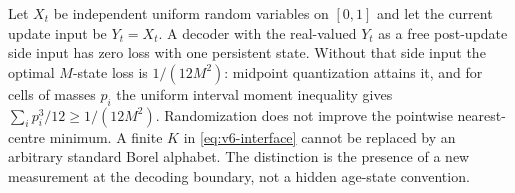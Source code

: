 \begin{example}
\label{ex:v6-interface}
Let $X_t$ be independent uniform random variables on $[0,1]$ and let
the current update input be $Y_t=X_t$. A decoder with the real-valued
$Y_t$ as a free post-update side input has zero loss with one persistent
state. Without that side input the optimal $M$-state loss is
$1/(12M^2)$: midpoint quantization attains it, and for cells of masses
$p_i$ the uniform interval moment inequality gives
$\sum_i p_i^3/12\ge1/(12M^2)$. Randomization does not improve the
pointwise nearest-centre minimum. A finite $K$ in
\eqref{eq:v6-interface} cannot be replaced by an arbitrary standard
Borel alphabet. The distinction is the presence of a new measurement
at the decoding boundary, not a hidden age-state convention.
\end{example}
